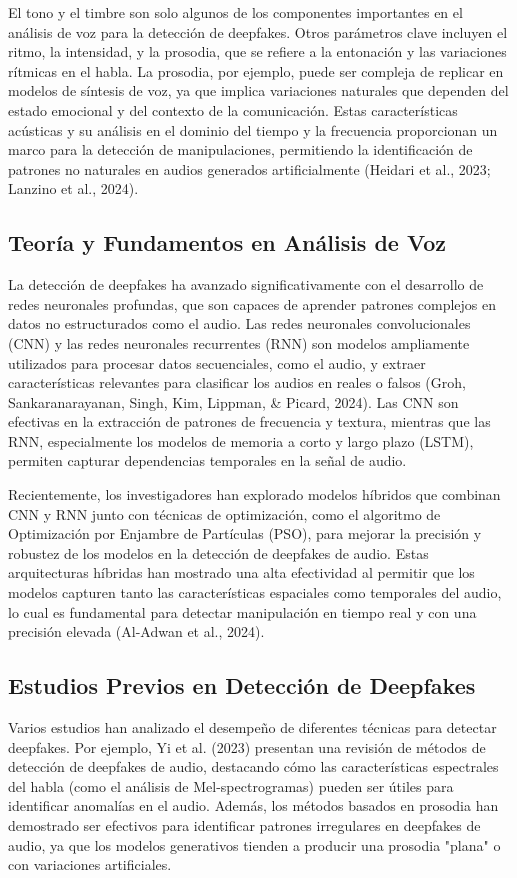 El tono y el timbre son solo algunos de los componentes importantes en el análisis de voz para la detección de deepfakes. Otros parámetros clave incluyen el ritmo, la intensidad, y la prosodia, que se refiere a la entonación y las variaciones rítmicas en el habla. La prosodia, por ejemplo, puede ser compleja de replicar en modelos de síntesis de voz, ya que implica variaciones naturales que dependen del estado emocional y del contexto de la comunicación. Estas características acústicas y su análisis en el dominio del tiempo y la frecuencia proporcionan un marco para la detección de manipulaciones, permitiendo la identificación de patrones no naturales en audios generados artificialmente (Heidari et al., 2023; Lanzino et al., 2024).

\subsection{Teoría y Fundamentos en Análisis de Voz}

La detección de deepfakes ha avanzado significativamente con el desarrollo de redes neuronales profundas, que son capaces de aprender patrones complejos en datos no estructurados como el audio. Las redes neuronales convolucionales (CNN) y las redes neuronales recurrentes (RNN) son modelos ampliamente utilizados para procesar datos secuenciales, como el audio, y extraer características relevantes para clasificar los audios en reales o falsos (Groh, Sankaranarayanan, Singh, Kim, Lippman, \& Picard, 2024). Las CNN son efectivas en la extracción de patrones de frecuencia y textura, mientras que las RNN, especialmente los modelos de memoria a corto y largo plazo (LSTM), permiten capturar dependencias temporales en la señal de audio.

Recientemente, los investigadores han explorado modelos híbridos que combinan CNN y RNN junto con técnicas de optimización, como el algoritmo de Optimización por Enjambre de Partículas (PSO), para mejorar la precisión y robustez de los modelos en la detección de deepfakes de audio. Estas arquitecturas híbridas han mostrado una alta efectividad al permitir que los modelos capturen tanto las características espaciales como temporales del audio, lo cual es fundamental para detectar manipulación en tiempo real y con una precisión elevada (Al-Adwan et al., 2024).

\subsection{Estudios Previos en Detección de Deepfakes}
Varios estudios han analizado el desempeño de diferentes técnicas para detectar deepfakes. Por ejemplo, Yi et al. (2023) presentan una revisión de métodos de detección de deepfakes de audio, destacando cómo las características espectrales del habla (como el análisis de Mel-spectrogramas) pueden ser útiles para identificar anomalías en el audio. Además, los métodos basados en prosodia han demostrado ser efectivos para identificar patrones irregulares en deepfakes de audio, ya que los modelos generativos tienden a producir una prosodia "plana" o con variaciones artificiales.


